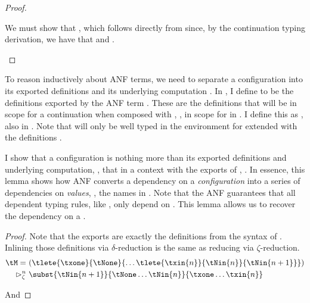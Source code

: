 {\begin{proof}
\begin{proofcases}
      We must show that \im{\styjudg{\tlenv}{\tlete{\ty}{\tN}{\tM}}{\tB}}, which
      follows directly from  since, by the continuation typing
      derivation, we have that \im{\styjudg{\tlenv,\ty=\tN}{\tM}{\tB}} and \im{\ty \not\in \FV(\tB)}. \qedhere
  \end{proofcases}
\end{proof}

\FigStackExports
To reason inductively about ANF terms, we need to separate a configuration
\im{\tM} into its exported definitions \im{\edefs{\tM}} and its underlying
computation \im{\ehole{\tM}}.
In , I define \im{\edefs{\tM}} to be the
definitions exported by the ANF term \im{\tM}.
These are the definitions that will be in scope for a continuation \im{\tK} when
composed with \im{\tM}, \ie, in scope for \im{\tK} in \im{\tK\hhw{\tM}}.
I define this as \im{\ehole{\tM}}, also in .
Note that \im{\ehole{\tM}} will only be well typed in the environment for
\im{\tM} extended with the definitions \im{\edefs{\tM}}.

I show that a configuration is nothing more than its exported definitions and
underlying computation, \ie, that in a context with the exports of
\im{\edefs{\tM}}, \im{\ehole{\tM} \equiv \tM}.
In essence, this lemma shows how ANF converts a dependency on a
\emph{configuration} \im{\tM} into a series of dependencies on \emph{values},
\ie, the names
 in \im{\edefs{\tM}}.
Note that the ANF guarantees that all dependent typing rules, like
\im{\tappe{\tV}{\tVpr} : \subst{\tB}{\tVpr}{\tx}}, only depend on
.
This lemma allows us to recover the dependency on a
.
\begin{lemma}
  \label{lem:anf:export-equal}
  \im{\sequivjudg{\tedefs{\tM}}{\tehole{\tM}}{\tM}}
\end{lemma}
\begin{proof}
  Note that the exports \im{\tedefs{\tM}} are exactly the definitions from
  the syntax of \im{\tM}.
  Inlining those definitions via \(\delta\)-reduction is the same as reducing
  \im{\tM} via \(\zeta\)-reduction.
  \begin{align}
    \tM =~&(\tlete{\txone}{\tNone}{\dots\tlete{\txin{n}}{\tNin{n}}{\tNin{n+1}}}) \\
    \step_{\zeta}^n~& \subst{\tNin{n+1}}{\tNone\dots\tNin{n}}{\txone\dots\txin{n}}
    \end{align}

  And 
\end{proof}
}
